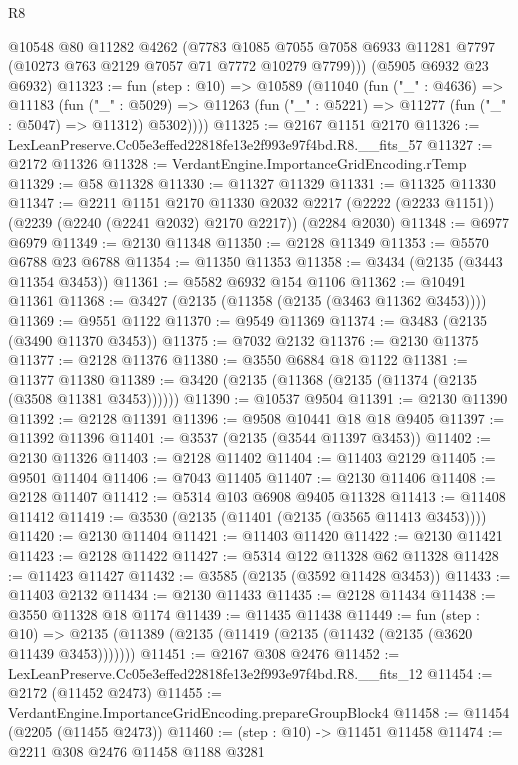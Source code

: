 \begin{lexlean}{R8}
\begin{coremodule}
      @10548
      @80
      @11282
      @4262
      (@7783 @1085 @7055 @7058 @6933 @11281 @7797 (@10273 @763 @2129 @7057 @71 @7772 @10279 @7799)))
    (@5905 @6932 @23 @6932)
@11323 := fun (step : @10) =>
  @10589
    (@11040
      (fun ("_" : @4636) =>
      @11183
        (fun ("_" : @5029) =>
        @11263 (fun ("_" : @5221) => @11277 (fun ("_" : @5047) => @11312) @5302))))
@11325 := @2167 @1151 @2170
@11326 := LexLeanPreserve.Cc05e3effed22818fe13e2f993e97f4bd.R8.__fits_57
@11327 := @2172 @11326
@11328 := VerdantEngine.ImportanceGridEncoding.rTemp
@11329 := @58 @11328
@11330 := @11327 @11329
@11331 := @11325 @11330
@11347 := @2211
    @1151
    @2170
    @11330
    @2032
    @2217
    (@2222 (@2233 @1151))
    (@2239 (@2240 (@2241 @2032) @2170 @2217))
    (@2284 @2030)
@11348 := @6977 @6979
@11349 := @2130 @11348
@11350 := @2128 @11349
@11353 := @5570 @6788 @23 @6788
@11354 := @11350 @11353
@11358 := @3434 (@2135 (@3443 @11354 @3453))
@11361 := @5582 @6932 @154 @1106
@11362 := @10491 @11361
@11368 := @3427 (@2135 (@11358 (@2135 (@3463 @11362 @3453))))
@11369 := @9551 @1122
@11370 := @9549 @11369
@11374 := @3483 (@2135 (@3490 @11370 @3453))
@11375 := @7032 @2132
@11376 := @2130 @11375
@11377 := @2128 @11376
@11380 := @3550 @6884 @18 @1122
@11381 := @11377 @11380
@11389 := @3420 (@2135 (@11368 (@2135 (@11374 (@2135 (@3508 @11381 @3453))))))
@11390 := @10537 @9504
@11391 := @2130 @11390
@11392 := @2128 @11391
@11396 := @9508 @10441 @18 @18 @9405
@11397 := @11392 @11396
@11401 := @3537 (@2135 (@3544 @11397 @3453))
@11402 := @2130 @11326
@11403 := @2128 @11402
@11404 := @11403 @2129
@11405 := @9501 @11404
@11406 := @7043 @11405
@11407 := @2130 @11406
@11408 := @2128 @11407
@11412 := @5314 @103 @6908 @9405 @11328
@11413 := @11408 @11412
@11419 := @3530 (@2135 (@11401 (@2135 (@3565 @11413 @3453))))
@11420 := @2130 @11404
@11421 := @11403 @11420
@11422 := @2130 @11421
@11423 := @2128 @11422
@11427 := @5314 @122 @11328 @62 @11328
@11428 := @11423 @11427
@11432 := @3585 (@2135 (@3592 @11428 @3453))
@11433 := @11403 @2132
@11434 := @2130 @11433
@11435 := @2128 @11434
@11438 := @3550 @11328 @18 @1174
@11439 := @11435 @11438
@11449 := fun (step : @10) =>
  @2135 (@11389 (@2135 (@11419 (@2135 (@11432 (@2135 (@3620 @11439 @3453)))))))
@11451 := @2167 @308 @2476
@11452 := LexLeanPreserve.Cc05e3effed22818fe13e2f993e97f4bd.R8.__fits_12
@11454 := @2172 (@11452 @2473)
@11455 := VerdantEngine.ImportanceGridEncoding.prepareGroupBlock4
@11458 := @11454 (@2205 (@11455 @2473))
@11460 := (step : @10) -> @11451 @11458
@11474 := @2211
    @308
    @2476
    @11458
    @1188
    @3281

\end{coremodule}
\end{lexlean}

